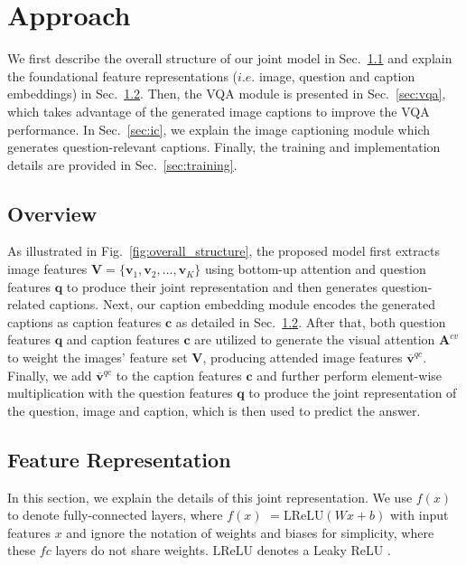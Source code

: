 \documentclass[11pt,a4paper]{article}
\begin{document}
\section{Approach}
We first describe the overall structure of our joint model in Sec.\
\ref{sec:overview} and explain the foundational feature representations ($i.e.$ image, question and caption embeddings) in Sec.\ \ref{sec:feat_repr}. Then, the VQA module is presented in Sec.\ \ref{sec:vqa}, which takes advantage of the generated image captions to improve the VQA performance. In Sec.\ \ref{sec:ic}, we explain the image captioning module which generates question-relevant captions. Finally, the training and implementation details are provided in Sec.\ \ref{sec:training}.



\subsection{Overview}
\label{sec:overview}
As illustrated in Fig.\ \ref{fig:overall_structure}, the proposed model first extracts image features $\textbf{V}=\{\textbf{v}_1, \textbf{v}_2, ..., \textbf{v}_K\}$ using bottom-up attention and question features $\textbf{q}$ to produce their joint representation and then generates question-related captions. 
Next, our caption embedding module encodes the generated captions as caption features $\textbf{c}$ as detailed in Sec.\ \ref{sec:feat_repr}. 
After that, both question features $\textbf{q}$ and caption features $\textbf{c}$ are utilized to generate the visual attention $\textbf{A}^{cv}$ to weight the images' feature set $\textbf{V}$, producing attended image features $\overline{\textbf{v}}^{qc}$. Finally, we add $\overline{\textbf{v}}^{qc}$ to the caption features $\textbf{c}$ and further perform element-wise multiplication with the question features $\textbf{q}$ \cite{anderson2017bottom} to produce the joint representation of the question, image and caption, which is then used to predict the answer.


\subsection{Feature Representation}
\label{sec:feat_repr}
In this section, we explain the details of this joint representation. We use $f(x)$ to denote fully-connected layers, where $f(x)$ $ = \text{LReLU}(Wx + b)$ with input features $x$ and ignore the notation of weights and biases for simplicity, where these $fc$ layers do not share weights. $\text{LReLU}$ denotes a Leaky ReLU \cite{he2015delving}.\\
\end{document}
